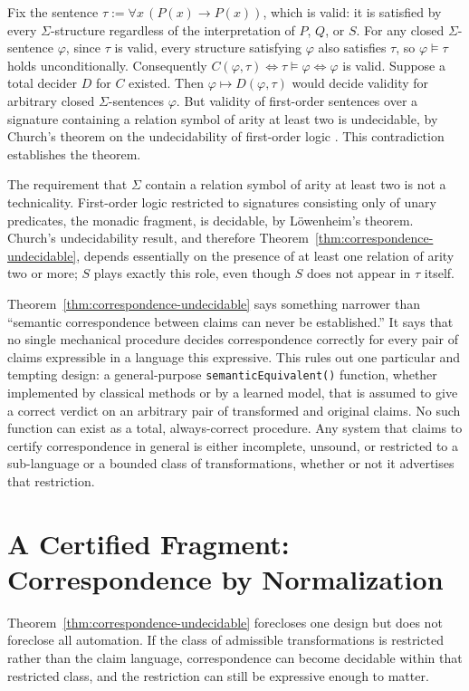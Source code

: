 Fix the sentence $\tau := \forall x\, (P(x) \to P(x))$, which is valid: it is satisfied by every $\Sigma$-structure regardless of the interpretation of $P$, $Q$, or $S$. For any closed $\Sigma$-sentence $\varphi$, since $\tau$ is valid, every structure satisfying $\varphi$ also satisfies $\tau$, so $\varphi \models \tau$ holds unconditionally. Consequently $C(\varphi,\tau) \iff \tau \models \varphi \iff \varphi$ is valid. Suppose a total decider $D$ for $C$ existed. Then $\varphi \mapsto D(\varphi,\tau)$ would decide validity for arbitrary closed $\Sigma$-sentences $\varphi$. But validity of first-order sentences over a signature containing a relation symbol of arity at least two is undecidable, by Church's theorem on the undecidability of first-order logic \cite{church1936}. This contradiction establishes the theorem.

The requirement that $\Sigma$ contain a relation symbol of arity at least two is not a technicality. First-order logic restricted to signatures consisting only of unary predicates, the monadic fragment, is decidable, by L\"owenheim's theorem. Church's undecidability result, and therefore Theorem~\ref{thm:correspondence-undecidable}, depends essentially on the presence of at least one relation of arity two or more; $S$ plays exactly this role, even though $S$ does not appear in $\tau$ itself.

Theorem~\ref{thm:correspondence-undecidable} says something narrower than ``semantic correspondence between claims can never be established.'' It says that no single mechanical procedure decides correspondence correctly for every pair of claims expressible in a language this expressive. This rules out one particular and tempting design: a general-purpose \texttt{semanticEquivalent()} function, whether implemented by classical methods or by a learned model, that is assumed to give a correct verdict on an arbitrary pair of transformed and original claims. No such function can exist as a total, always-correct procedure. Any system that claims to certify correspondence in general is either incomplete, unsound, or restricted to a sub-language or a bounded class of transformations, whether or not it advertises that restriction.

\section{A Certified Fragment: Correspondence by Normalization}

Theorem~\ref{thm:correspondence-undecidable} forecloses one design but does not foreclose all automation. If the class of admissible transformations is restricted rather than the claim language, correspondence can become decidable within that restricted class, and the restriction can still be expressive enough to matter.


